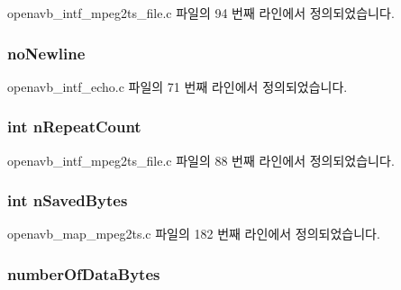 openavb\+\_\+intf\+\_\+mpeg2ts\+\_\+file.\+c 파일의 94 번째 라인에서 정의되었습니다.

\subsubsection[{\texorpdfstring{no\+Newline}{noNewline}}]{ no\+Newline}\hypertarget{structpvt__data__t_a1f948d9c6bb9a2996e67c91480384c87}{}\label{structpvt__data__t_a1f948d9c6bb9a2996e67c91480384c87}


openavb\+\_\+intf\+\_\+echo.\+c 파일의 71 번째 라인에서 정의되었습니다.

\subsubsection[{\texorpdfstring{n\+Repeat\+Count}{nRepeatCount}}]{\setlength{\rightskip}{0pt plus 5cm}int n\+Repeat\+Count}\hypertarget{structpvt__data__t_a36a4dcc2e7a27fe7dbde9f09a0cc53dc}{}\label{structpvt__data__t_a36a4dcc2e7a27fe7dbde9f09a0cc53dc}


openavb\+\_\+intf\+\_\+mpeg2ts\+\_\+file.\+c 파일의 88 번째 라인에서 정의되었습니다.

\subsubsection[{\texorpdfstring{n\+Saved\+Bytes}{nSavedBytes}}]{\setlength{\rightskip}{0pt plus 5cm}int n\+Saved\+Bytes}\hypertarget{structpvt__data__t_a4ce9088d823123ca5fc1e3321f0770d2}{}\label{structpvt__data__t_a4ce9088d823123ca5fc1e3321f0770d2}


openavb\+\_\+map\+\_\+mpeg2ts.\+c 파일의 182 번째 라인에서 정의되었습니다.

\subsubsection[{\texorpdfstring{number\+Of\+Data\+Bytes}{numberOfDataBytes}}]{ number\+Of\+Data\+Bytes}\hypertarget{structpvt__data__t_a9751877efbabcb0c1a9a58ede089da76}{}\label{structpvt__data__t_a9751877efbabcb0c1a9a58ede089da76}



